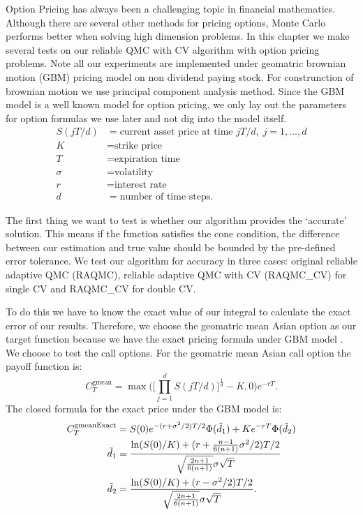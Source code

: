 

Option Pricing has always been a challenging topic in financial mathematics. 
Although there are several other methods for pricing options, Monte Carlo performs better when solving high dimension problems.
In this chapter we make several tests on our reliable QMC with CV algorithm with option pricing problems. 
Note all our experiments are implemented under geomatric brownian motion (GBM) pricing model on non dividend paying stock. For construnction of brownian motion we use principal component analysis method.
Since the GBM model is a well known model for option pricing, we only lay out the parameters for option formulas we use later and not dig into the model itself. 
\begin{align*}
    S(jT/d)&=\text{current asset price at time $jT/d,\; j=1,\dots,d$}\\
    K&=\text{strike price}\\
    T&=\text{expiration time}\\
    \sigma&=\text{volatility}\\
    r&=\text{interest rate}\\
    d&=\text{number of time steps}.
\end{align*}

The first thing we want to test is whether our algorithm provides the `accurate' solution. 
This means if the function satisfies the cone condition, the difference between our estimation and true value should be bounded by the pre-defined error tolerance. 
We test our algorithm for accuracy in three cases: original reliable adaptive QMC (RAQMC), reliable adaptive QMC with CV (RAQMC\_CV) for single CV and RAQMC\_CV for double CV. 

To do this we have to know the exact value of our integral to calculate the exact error of our results. 
Therefore, we choose the geomatric mean Asian option as our target function because we have the exact pricing formula under GBM model \cite{kemna1990pricing}. 
We choose to test the call options. For the geomatric mean Asian call option the payoff function is:   
\[ C_{T}^{\mathrm{gmean}} = \max\Big(\Big[\prod_{j=1}^{d}S(jT/d) \Big]^\frac{1}{d}-K, 0\Big)e^{-rT}.\]
The closed formula for the exact price under the GBM model is: 
\begin{align}
    C_{T}^{\mathrm{gmeanExact}} 
    &= S(0)e^{-(r+\sigma^2/2)T/2}\Phi(\tilde{d}_1)+Ke^{-rT}\Phi(\tilde{d}_2)    \label{eq:exactgmean}\\
    \tilde{d}_1 &=\frac{\ln(S(0)/K)+(r+\frac{n-1}{6(n+1)}\sigma^2/2)T/2}
    {\sqrt{\frac{2n+1}{6(n+1)}}\sigma\sqrt{T}}\notag\\
    \tilde{d}_2 &=\frac{\ln(S(0)/K)+(r-\sigma^2/2)T/2}
            {\sqrt{\frac{2n+1}{6(n+1)}}\sigma\sqrt{T}}\notag.
\end{align}

